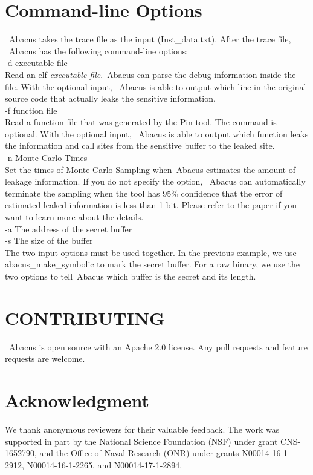 \documentclass[10pt,conference]{IEEEtran}
\newcommand{\tool}{\textsf{Abacus}}
\begin{document}
\section{Command-line Options}
~\tool{} takes the trace file as the input (\textsf{Inst\_data.txt}). After the trace file, ~\tool{} has the following command-line options:
\vspace{5pt}
\\\textsf{-d {executable file}}
\\ Read an elf \textit{executable file}.~\tool{} can parse the debug information inside the file. With the optional input, ~\tool{} is able to output which line in the original source code that actually leaks the sensitive information.
\vspace{5pt}
\\\textsf{-f {function file}}
\\Read a function file that was generated by the Pin tool. The command is optional. With the optional input, ~\tool{} is able to output which function leaks the information and call sites from the sensitive buffer to the leaked site.
\vspace{5pt}
\\\textsf{-n {Monte Carlo Times}}
\\ Set the times of Monte Carlo Sampling when~\tool{} estimates the amount of leakage information. If you do not specify the option, ~\tool{} can automatically terminate the sampling when the tool has 95\% confidence that the error of estimated leaked information is less than 1 bit. Please refer to the paper if you want to learn more about the details.
\vspace{5pt}
\\\textsf{-a {The address of the secret buffer} \\-s {The size of the buffer}}
\\The two input options must be used together. In the previous example, we use abacus\_make\_symbolic to mark the secret buffer. For a raw binary, we use the two options to tell~\tool{} which buffer is the secret and its length.

\section{CONTRIBUTING}
~\tool{} is open source with an Apache 2.0 license. Any pull requests and feature requests are welcome.

\section*{Acknowledgment}
We thank anonymous reviewers for their valuable feedback. The work was supported in part by the National Science Foundation (NSF) under grant CNS-1652790, and the Office of Naval Research (ONR) under grants N00014-16-1-2912, N00014-16-1-2265, and N00014-17-1-2894. 





\end{document}

